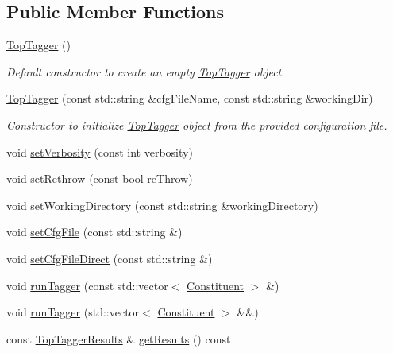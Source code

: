 \subsection*{Public Member Functions}
\begin{DoxyCompactItemize}
\item 
\hypertarget{classTopTagger_a26e4654b1eef1f7e7dcffeb02b9fc41b}{\hyperlink{classTopTagger_a26e4654b1eef1f7e7dcffeb02b9fc41b}{Top\-Tagger} ()}\label{classTopTagger_a26e4654b1eef1f7e7dcffeb02b9fc41b}

\begin{DoxyCompactList}\small\item\em Default constructor to create an empty \hyperlink{classTopTagger}{Top\-Tagger} object. \end{DoxyCompactList}\item 
\hypertarget{classTopTagger_a21e38d6b697bc079ab6fb0eb7a1ea3bb}{\hyperlink{classTopTagger_a21e38d6b697bc079ab6fb0eb7a1ea3bb}{Top\-Tagger} (const std\-::string \&cfg\-File\-Name, const std\-::string \&working\-Dir)}\label{classTopTagger_a21e38d6b697bc079ab6fb0eb7a1ea3bb}

\begin{DoxyCompactList}\small\item\em Constructor to initialize \hyperlink{classTopTagger}{Top\-Tagger} object from the provided configuration file. \end{DoxyCompactList}\item 
void \hyperlink{classTopTagger_ad7e22571559cb7afe0f0cf0e14d1ef41}{set\-Verbosity} (const int verbosity)
\item 
void \hyperlink{classTopTagger_ae117c09fc42674a09247fd1ad8dcb3ce}{set\-Rethrow} (const bool re\-Throw)
\item 
void \hyperlink{classTopTagger_ae03dce4873628bfd529924a9004b3304}{set\-Working\-Directory} (const std\-::string \&working\-Directory)
\item 
void \hyperlink{classTopTagger_ac18bfe0673dbd05973f45c668ed2b190}{set\-Cfg\-File} (const std\-::string \&)
\item 
void \hyperlink{classTopTagger_ae7a38be12023643495adea6f9a696ff3}{set\-Cfg\-File\-Direct} (const std\-::string \&)
\item 
void \hyperlink{classTopTagger_accf43da3b1469e524bfe6f568116219a}{run\-Tagger} (const std\-::vector$<$ \hyperlink{classConstituent}{Constituent} $>$ \&)
\item 
void \hyperlink{classTopTagger_ac4d5c2b7983a99495fa6cfa7e0287e74}{run\-Tagger} (std\-::vector$<$ \hyperlink{classConstituent}{Constituent} $>$ \&\&)
\item 
const \hyperlink{classTopTaggerResults}{Top\-Tagger\-Results} \& \hyperlink{classTopTagger_ac6f06aeb683b0b761ad09ac018e11d08}{get\-Results} () const 
\end{DoxyCompactItemize}
